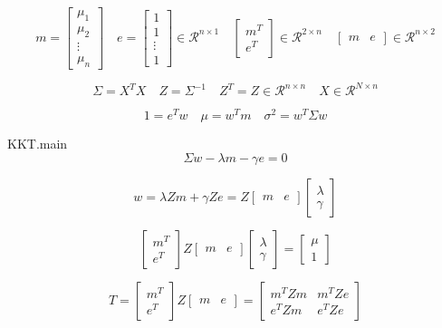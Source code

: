 \documentclass[10pt,a4paper]{article}
\begin{document}
\[
m = \left[ \begin{array}{c}
\mu_1 \\ \mu_2 \\ \vdots \\ \mu_{n}
\end{array} \right]
\quad
e = \left[ \begin{array}{c}
1 \\ 1 \\ \vdots \\ 1
\end{array} \right] \in \mathcal{R}^{n\times 1}
\quad
\left[ \begin{array}{c}
m^T \\ e^T
\end{array} \right] \in \mathcal{R}^{2\times n}
\quad
\left[ \begin{array}{cc}
m & e
\end{array} \right] \in \mathcal{R}^{n \times 2}
\]

\[
\Sigma = X^TX \quad Z = \Sigma^{-1}  \quad Z^T = Z \in \mathcal{R}^{n \times n} \quad X \in \mathcal{R}^{N \times n}
\]


\[
1 = e^Tw  \quad \mu = w^T m \quad \sigma^2 = w^T \Sigma w
\]

KKT.main
\[
\Sigma w - \lambda m - \gamma e = 0
\]

\[
w = \lambda Z m + \gamma Z e = Z \left[ \begin{array}{cc}
m & e
\end{array} \right]\left[ \begin{array}{c}
\lambda \\ \gamma
\end{array} \right]
\]

\[
\left[ \begin{array}{c}
m^T \\ e^T
\end{array} \right]
Z \left[ \begin{array}{cc}
m & e
\end{array} \right]\left[ \begin{array}{c}
\lambda \\ \gamma
\end{array} \right]=
\left[ \begin{array}{c}
\mu \\ 1
\end{array} \right]
\]

\[
T = \left[ \begin{array}{c}
m^T \\ e^T
\end{array} \right]
Z \left[ \begin{array}{cc}
m & e
\end{array} \right] = \left[ \begin{array}{cc}
m^TZm & m^TZe \\ e^TZm & e^TZe
\end{array} \right]
\]
\end{document}
